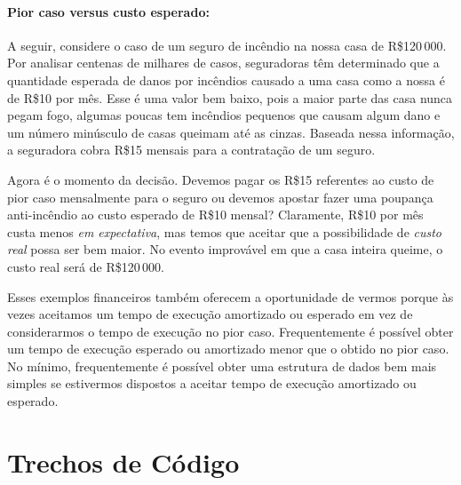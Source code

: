 \paragraph{Pior caso versus custo esperado:}
%
A seguir, considere o caso de um seguro de incêndio na nossa casa de R\$120\,000.
Por analisar centenas de milhares de casos, seguradoras têm determinado que a quantidade esperada de danos por incêndios causado a uma casa como a nossa é de
R\$10 por mês.  
Esse é uma valor bem baixo, pois a maior parte das casa nunca pegam fogo, algumas poucas tem incêndios pequenos que causam algum dano e um número minúsculo de casas queimam até as cinzas. Baseada nessa informação, a seguradora cobra
R\$15 mensais para a contratação de um seguro.

Agora é o momento da decisão. Devemos pagar os 
 R\$15 referentes ao custo de pior caso mensalmente para o seguro ou devemos
apostar fazer uma poupança anti-incêndio ao custo esperado de
R\$10 mensal?  Claramente, R\$10 por mês custa menos \emph{em expectativa},
mas temos que aceitar que a possibilidade de \emph{custo real} possa ser bem maior.
No evento improvável em que a casa inteira queime, o custo real será de R\$120\,000.

Esses exemplos financeiros também oferecem a oportunidade de vermos porque às vezes aceitamos um tempo de execução amortizado ou esperado em vez de considerarmos o tempo de execução no pior caso. Frequentemente é possível obter um tempo de execução esperado ou amortizado menor que o obtido no pior caso. 
No mínimo, frequentemente é possível obter uma estrutura de dados bem mais simples se estivermos dispostos a aceitar tempo de execução amortizado ou esperado.

\section{Trechos de Código}

